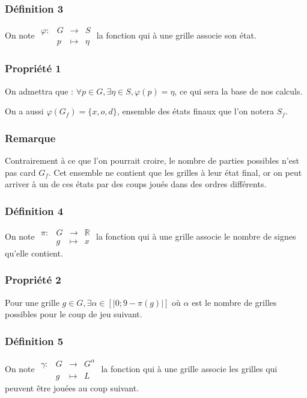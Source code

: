 \documentclass{article}
\begin{document}
\subsubsection{Définition 3}
On note $\begin{array}{lrcl}
\varphi : & G & \longrightarrow & S \\
    & p & \longmapsto & \eta \end{array}$ la fonction qui à une grille associe son état.

\subsubsection{Propriété 1}
On admettra que : $ \forall p \in G, \exists \eta \in S, \varphi (p)=\eta$, ce qui sera la base de nos calculs.

On a aussi  $\varphi(G_{f}) = \{x,o,d\}$, ensemble des états finaux que l'on notera $S_{f}$.

\subsubsection{Remarque}
Contrairement à ce que l'on pourrait croire, le nombre de parties possibles n'est pas card  $G_{f}$. Cet ensemble ne contient que les grilles à leur état final, or on peut arriver à un de ces états par des coups joués dans des ordres différents.

\subsubsection{Définition 4}

On note $\begin{array}{lrcl}
\pi : & G & \longrightarrow & \mathbb{R} \\
    & g & \longmapsto & x \end{array}$ la fonction qui à une grille associe le nombre de signes qu'elle contient.

\subsubsection{Propriété 2}

Pour une grille $g \in G,  \exists  \alpha{} \in [|0;9-\pi(g)|]$ où $\alpha$ est le nombre de grilles possibles pour le coup de jeu suivant. 

\subsubsection{Définition 5}
On note $\begin{array}{lrcl}
\gamma : & G & \longrightarrow & G^{\alpha} \\
    & g & \longmapsto & L \end{array}$ la fonction qui à une grille associe les grilles qui peuvent être jouées au coup suivant.
\end{document}
